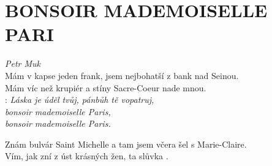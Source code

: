 \section*{\Huge BONSOIR MADEMOISELLE PARI}
\emph{Petr Muk}\\

Mám v kapse jeden frank, jsem nejbohatší z bank nad Seinou.\\
Mám víc než krupiér a stíny Sacre-Coeur nade mnou.\\

\textregistered:
\emph{
Láska je úděl tvůj, pánbůh tě vopatruj,\\
bonsoir mademoiselle Paris,\\
bonsoir mademoiselle Paris.\\
}

Znám bulvár Saint Michelle a tam jsem včera šel s Marie-Claire.\\
Vím, jak zní z úst krásných žen, ta slůvka .\\

\textregistered \textregistered

\newpage


